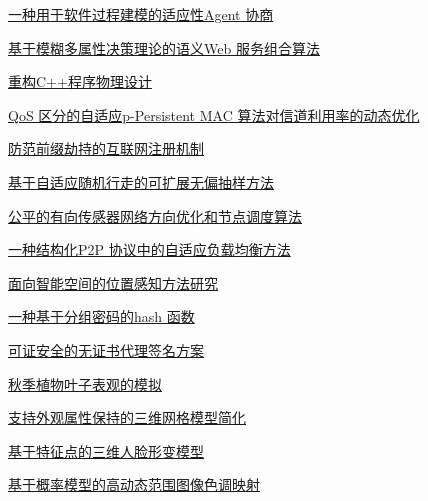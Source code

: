 \documentclass[a4paper]{article}
\begin{document}
\href{http://www.jos.org.cn/ch/reader/download_pdf.aspx?file_no=3314&year_id=2009&quarter_id=3&falg=1}{一种用于软件过程建模的适应性Agent 协商}

\href{http://www.jos.org.cn/ch/reader/download_pdf.aspx?file_no=3341&year_id=2009&quarter_id=3&falg=1}{基于模糊多属性决策理论的语义Web 服务组合算法}

\href{http://www.jos.org.cn/ch/reader/download_pdf.aspx?file_no=550&year_id=2009&quarter_id=3&falg=1}{重构C++程序物理设计}

\href{http://www.jos.org.cn/ch/reader/download_pdf.aspx?file_no=3239&year_id=2009&quarter_id=3&falg=1}{QoS 区分的自适应p-Persistent MAC 算法对信道利用率的动态优化}

\href{http://www.jos.org.cn/ch/reader/download_pdf.aspx?file_no=3221&year_id=2009&quarter_id=3&falg=1}{防范前缀劫持的互联网注册机制}

\href{http://www.jos.org.cn/ch/reader/download_pdf.aspx?file_no=3206&year_id=2009&quarter_id=3&falg=1}{基于自适应随机行走的可扩展无偏抽样方法}

\href{http://www.jos.org.cn/ch/reader/download_pdf.aspx?file_no=3207&year_id=2009&quarter_id=3&falg=1}{公平的有向传感器网络方向优化和节点调度算法}

\href{http://www.jos.org.cn/ch/reader/download_pdf.aspx?file_no=3226&year_id=2009&quarter_id=3&falg=1}{一种结构化P2P 协议中的自适应负载均衡方法}

\href{http://www.jos.org.cn/ch/reader/download_pdf.aspx?file_no=3228&year_id=2009&quarter_id=3&falg=1}{面向智能空间的位置感知方法研究}

\href{http://www.jos.org.cn/ch/reader/download_pdf.aspx?file_no=556&year_id=2009&quarter_id=3&falg=1}{一种基于分组密码的hash 函数}

\href{http://www.jos.org.cn/ch/reader/download_pdf.aspx?file_no=574&year_id=2009&quarter_id=3&falg=1}{可证安全的无证书代理签名方案}

\href{http://www.jos.org.cn/ch/reader/download_pdf.aspx?file_no=3299&year_id=2009&quarter_id=3&falg=1}{秋季植物叶子表观的模拟}

\href{http://www.jos.org.cn/ch/reader/download_pdf.aspx?file_no=3304&year_id=2009&quarter_id=3&falg=1}{支持外观属性保持的三维网格模型简化}

\href{http://www.jos.org.cn/ch/reader/download_pdf.aspx?file_no=3317&year_id=2009&quarter_id=3&falg=1}{基于特征点的三维人脸形变模型}

\href{http://www.jos.org.cn/ch/reader/download_pdf.aspx?file_no=3371&year_id=2009&quarter_id=3&falg=1}{基于概率模型的高动态范围图像色调映射}
\end{document}
